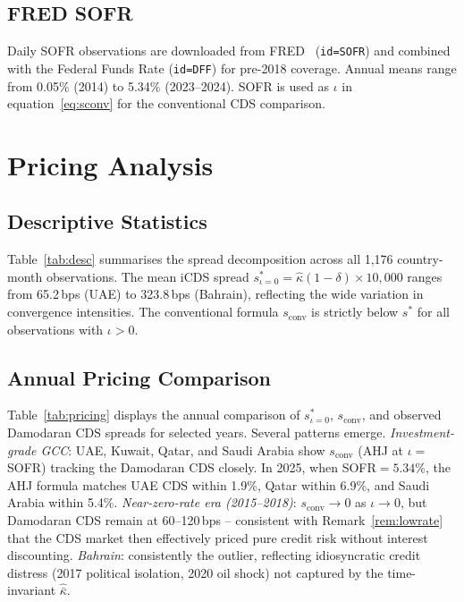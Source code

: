 \documentclass[12pt]{article}
\theoremstyle{plain}
\theoremstyle{definition}
\theoremstyle{remark}
\begin{document}
\subsection{FRED SOFR}

Daily SOFR observations are downloaded from FRED~\cite{FRED2026}
(\texttt{id=SOFR}) and combined with the Federal Funds Rate
(\texttt{id=DFF}) for pre-2018 coverage.
Annual means range from 0.05\% (2014) to 5.34\% (2023--2024).
SOFR is used as $\iota$ in equation~\eqref{eq:sconv} for the
conventional CDS comparison.

\section{Pricing Analysis}
\label{sec:pricing}

\subsection{Descriptive Statistics}

Table~\ref{tab:desc} summarises the spread decomposition across all
1,176 country-month observations.
The mean iCDS spread $s^*_{\iota=0} = \hat{\kappa}(1-\delta)\times 10{,}000$
ranges from 65.2\,bps (UAE) to 323.8\,bps (Bahrain), reflecting the wide
variation in convergence intensities.
The conventional formula $s_{\text{conv}}$ is strictly below $s^*$ for
all observations with $\iota > 0$.



\subsection{Annual Pricing Comparison}

Table~\ref{tab:pricing} displays the annual comparison of $s^*_{\iota=0}$,
$s_{\text{conv}}$, and observed Damodaran CDS spreads for selected years.
Several patterns emerge.
\emph{Investment-grade GCC}: UAE, Kuwait, Qatar, and Saudi Arabia show
$s_{\text{conv}}$ (AHJ at $\iota=$SOFR) tracking the Damodaran CDS closely.
In 2025, when SOFR$=5.34\%$, the AHJ formula matches UAE CDS within 1.9\%,
Qatar within 6.9\%, and Saudi Arabia within 5.4\%.
\emph{Near-zero-rate era (2015--2018)}: $s_{\text{conv}} \to 0$ as
$\iota \to 0$, but Damodaran CDS remain at 60--120\,bps -- consistent with
Remark~\ref{rem:lowrate} that the CDS market then effectively priced pure
credit risk without interest discounting.
\emph{Bahrain}: consistently the outlier, reflecting idiosyncratic credit
distress (2017 political isolation, 2020 oil shock) not captured by the
time-invariant $\hat{\bar{\kappa}}$.
\end{document}
